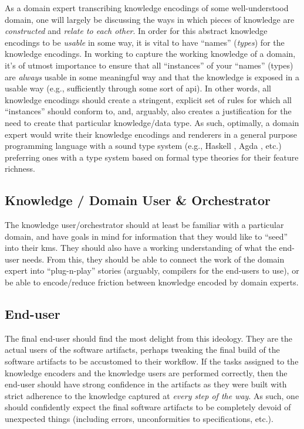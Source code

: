 As a domain expert transcribing knowledge encodings of some well-understood
domain, one will largely be discussing the ways in which pieces of knowledge are
\textit{constructed} and \textit{relate to each other}. In order for this
abstract knowledge encodings to be \textit{usable} in some way, it is vital to
have ``names'' (\textit{types}) for the knowledge encodings. In working to
capture the working knowledge of a domain, it's of utmost importance to ensure
that all ``instances'' of your ``names'' (types) are \textit{always} usable in
some meaningful way and that the knowledge is exposed in a usable way (e.g.,
sufficiently through some sort of \acs{api}). In other words, all knowledge
encodings should create a stringent, explicit set of rules for which all
``instances'' should conform to, and, arguably, also creates a justification for
the need to create that particular knowledge/data type. As such, optimally, a
domain expert would write their knowledge encodings and renderers in a general
purpose programming language with a sound type system (e.g., Haskell
\cite{Haskell2010}, Agda \cite{Norell2007}, etc.) \textemdash{} preferring ones
with a type system based on formal type theories for their feature richness.

\subsection{Knowledge / Domain User \& Orchestrator}

The knowledge user/orchestrator should at least be familiar with a particular
domain, and have goals in mind for information that they would like to ``seed''
into their \acl{kms}. They should also have a working understanding of what the
end-user needs. From this, they should be able to connect the work of the domain
expert into ``plug-n-play'' stories (arguably, compilers for the end-users to
use), or be able to encode/reduce friction between knowledge encoded by domain
experts.

\subsection{End-user}

The final end-user should find the most delight from this ideology. They are the
actual users of the software artifacts, perhaps tweaking the final build of the
software artifacts to be accustomed to their workflow. If the tasks assigned to
the knowledge encoders and the knowledge users are performed correctly, then the
end-user should have strong confidence in the artifacts as they were built with
strict adherence to the knowledge captured at \textit{every step of the way}. As
such, one should confidently expect the final software artifacts to be
completely devoid of unexpected things (including errors, unconformities to
specifications, etc.).

